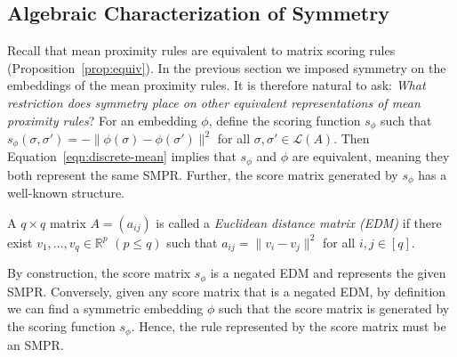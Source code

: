 \documentclass[prodmode]{acmsmall-ec14}
\newcommand{\calL}{{\mathcal{L}}}
\newcommand{\rank}{{\calL(A)}}
\begin{document}
%




\subsection{Algebraic Characterization of Symmetry}
\label{sec:smpr-char}

Recall that mean proximity rules are equivalent to matrix scoring rules (Proposition~\ref{prop:equiv}). In the previous section we imposed symmetry on the embeddings of the mean proximity rules. It is therefore natural to ask: \emph{What restriction does symmetry place on other equivalent representations of mean proximity rules}? For an embedding $\phi$, define the scoring function $s_{\phi}$ such that $s_{\phi}(\sigma,\sigma') = -\|\phi(\sigma)-\phi(\sigma')\|^2$ for all $\sigma,\sigma' \in \rank$. Then Equation~\eqref{eqn:discrete-mean} implies that $s_{\phi}$ and $\phi$ are equivalent, meaning they both represent the same SMPR. Further, the score matrix generated by $s_{\phi}$ has a well-known structure.


\begin{definition}
A $q \times q$ matrix $A = (a_{ij})$ is called a \emph{Euclidean distance matrix (EDM)} if there exist $v_1,\ldots,v_q \in \mathbb{R}^p$ $(p \leq q)$ such that $a_{ij} = \|v_i-v_j\|^2$ for all $i,j \in [q]$. 
\end{definition}
%
By construction, the score matrix $s_{\phi}$ is a negated EDM and represents the given SMPR.  Conversely, given any score matrix that is a negated EDM, by definition we can find a symmetric embedding $\phi$ such that the score matrix is generated by the scoring function $s_{\phi}$. Hence, the rule represented by the score matrix must be an SMPR. 
\end{document}
